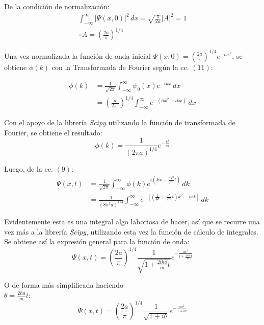 De la condición de normalización:
\begin{gather*}
    \int_{-\infty}^{\infty} \lvert\Psi(x,0)\rvert^2\,dx = \sqrt{\frac{\pi}{2a}} \lvert A \rvert^2 = 1 \\
    \therefore A = \left (\frac{2a}{\pi}\right )^{1/4}
\end{gather*}

Una vez normalizada la función de onda inicial $\Psi(x,0) = \left (\frac{2a}{\pi}\right )^{1/4} e^{-ax^2}$, se obtiene 
$\phi(k)$ con la Transformada de Fourier según la ec. $(11)$:

\begin{align*}
    \phi(k) &= \frac{1}{\sqrt{2\pi}} \int_{-\infty}^{\infty} \psi_{0}(x)e^{-ikx}\,dx \\
    &= \left(\frac{a}{2\pi^3}\right)^{1/4} \int_{-\infty}^{\infty} e^{-(ax^2+ikx)}\,dx
\end{align*}

Con el apoyo de la librería \emph{Scipy} utilizando la función de transformada de Fourier, se obtiene el resultado:
\begin{equation}
    \phi(k) = \frac{1}{(2\pi a)^{1/4}} e^{-\frac{k^2}{4a}}
\end{equation}

Luego, de la ec. $(9)$:
\begin{align*}
    \Psi(x,t) &= \frac{1}{\sqrt{2\pi}} \int_{-\infty}^{\infty} \phi(k)e^{i(kx-\frac{\hbar k^2}{2m} t)}\,dk \\
    &= \frac{1}{(8\pi^3 a)^{1/4}} \int_{-\infty}^{\infty} e^{-\left[ \left( \frac{1}{4a}+\frac{i\hbar}{2m}t \right)k^2 - ixk\right]} \,dk
\end{align*}

Evidentemente esta es una integral algo laboriosa de hacer, así que se recurre una vez más a la librería \emph{Scipy}, 
utilizando esta vez la función de cálculo de integrales.\\
Se obtiene así la expresión general para la función de onda:
\begin{equation*}
    \Psi(x,t) = \left( \frac{2a}{\pi} \right)^{1/4} \frac{1}{\sqrt{1+\frac{2i\hbar a}{m}t}} e^{-\frac{ax^2}{1+\frac{2i\hbar a}{m}t}}
\end{equation*}

O de forma más simplificada haciendo\\ $\theta=\frac{2\hbar a}{m}t$:
\begin{equation}
    \Psi(x,t) = \left( \frac{2a}{\pi} \right)^{1/4} \frac{1}{\sqrt{1+i\theta}} e^{-\frac{ax^2}{1+i\theta}}
\end{equation}